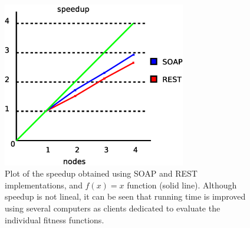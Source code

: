 \documentclass[final,1p,times]{elsarticle}
\begin{document}
\begin{figure}[!ht]
\begin{center}
\includegraphics[width=8cm]{ganancia.eps}
\caption{Plot of the speedup obtained using SOAP and REST implementations, and $f(x) = x$ function (solid line). Although speedup is not lineal, it can be seen that running time is improved using several computers as clients dedicated to evaluate the individual fitness functions. 
}
\label{fig:ganancia}
\end{center}
\end{figure}


\end{document}
